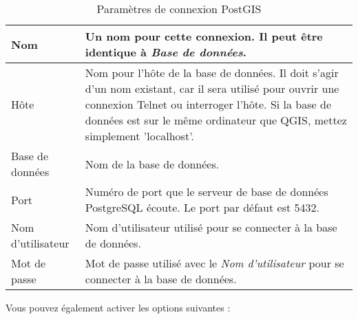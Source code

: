 \begin{table}[ht]
\centering
\caption{Paramètres de connexion PostGIS}\label{tab:postgis_connection_parms}\medskip
\begin{tabular}{|l|p{5in}|}
\hline Nom & Un nom pour cette connexion. Il peut être identique à \textsl{Base de données}.\\
\hline Hôte \index{PostgreSQL!host} & Nom pour l'hôte de la base de données. Il doit s'agir d'un nom existant, car il sera utilisé pour ouvrir une connexion Telnet ou interroger l'hôte. Si la base de données est sur le même ordinateur que QGIS, mettez simplement 'localhost'. \\
\hline Base de données \index{PostgreSQL!database} & Nom de la base de données.\\
\hline Port \index{PostgreSQL!port}& Numéro de port que le serveur de base de données PostgreSQL écoute. Le port par défaut est 5432.\\
\hline Nom d'utilisateur \index{PostgreSQL!username} & Nom d'utilisateur utilisé pour se connecter à la base de données.\\
\hline Mot de passe \index{PostgreSQL!password} & Mot de passe utilisé avec le \textsl{Nom d'utilisateur} pour se connecter à la base de données.\\
\hline
\end{tabular}
\end{table}

Vous pouvez également activer les options suivantes :

